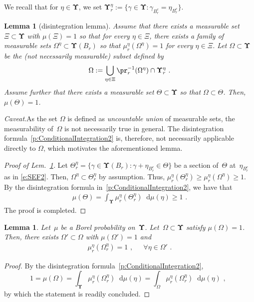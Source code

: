 \documentclass[11pt,letterpaper]{amsart}
\newcommand{\diff}{\mathop{}\!\mathrm{d}}
\newcommand{\comma}{\,\,\mathrm{,}\;\,}
\newcommand{\fstop}{\,\,\mathrm{.}}
\newcommand{\QP}{{\mu}}
\newcommand{\dUpsilon}{{\mathbf \Upsilon}}
\newcommand{\U}{\dUpsilon}
\renewcommand{\1}{\mathbf 1}
\numberwithin{equation}{section}
\theoremstyle{plain}
\newtheorem{lem}[thm]{Lemma}%
\theoremstyle{definition}
\theoremstyle{remark}
\renewcommand{\paragraph}[1]{\medskip\emph{#1}.\quad}
\begin{document}
\begin{appendix}
We recall that for $\eta \in \U$, we set $\U_r^\eta:=\{\gamma \in \U: \gamma_{B_r^c}=\eta_{B_r^c}\}$.
\begin{lem}[disintegration lemma] \label{l:sp}
Assume that there exists a measurable set $\Xi \subset \U$ with $\QP(\Xi)=1$ so that for every $\eta \in \Xi$, there exists a family of measurable sets $\Omega^\eta \subset \U(B_r)$ so that $\mu_{r}^\eta(\Omega^\eta)=1$ for every $\eta \in \Xi$. Let $\Omega \subset \U$ be the (not necessarily measurable) subset defined by
$$\Omega:=\bigcup_{\eta \in \Xi} \pr_{r}^{-1}(\Omega^\eta) \cap \U_{r}^{\eta} \fstop$$ 
Assume further that there exists a measurable set $\Theta \subset \U$ so that $\Omega \subset \Theta$. Then, $\QP(\Theta)=1$. 
\end{lem}
\paragraph{Caveat}As the set $\Omega$ is defined as {\it uncountable union} of measurable sets, the measurability of~$\Omega$ is not necessarily true in general. The disintegration formula~\eqref{p:ConditionalIntegration2} is, therefore, not necessarily applicable directly to $\Omega$,  which motivates the aforementioned lemma. 
\begin{proof}[Proof of Lem.\ \ref{l:sp}]
Let $\Theta_{r}^{\eta}=\{\gamma \in \U(B_r): \gamma+\eta_{B_r^c} \in \Theta\}$ be a section of~$\Theta$ at~$\eta_{B_r^c}$ as in \eqref{e:SEF2}. Then, $\Omega^{\eta} \subset \Theta_{r}^{\eta}$ by assumption. Thus, $\mu_r^\eta(\Theta_{r}^{\eta}) \ge \mu_r^\eta(\Omega^{\eta})\ge 1$. By the disintegration formula in~\eqref{p:ConditionalIntegration2}, we have that 
\begin{align*}
\mu(\Theta)= \int_{\U} \mu_r^\eta(\Theta_{r}^{\eta}) \diff \mu(\eta)  \ge 1\fstop
\end{align*}
The proof is completed. 
\end{proof}



  
  \begin{lem}\label{l:FL}
  Let~$\QP$ be a Borel probability on~$\U$. 
  Let~$\Omega \subset \U$ satisfy $\QP(\Omega)=1$. Then, there exists $\Omega'\subset \Omega$ with $\QP(\Omega')=1$ and 
  \begin{align}\label{e:FL}
  \QP_r^\eta(\Omega_r^\eta)=1\comma  \quad \forall\eta \in \Omega' \fstop
  \end{align}
  \end{lem}
  \begin{proof}
  By the disintegration formula~\eqref{p:ConditionalIntegration2}, 
  $$1=\QP(\Omega)=\int_{\U} \QP_r^\eta(\Omega_r^\eta) \diff \QP(\eta) =\int_{\Omega} \QP_r^\eta(\Omega_r^\eta) \diff \QP(\eta) \comma$$
  by which the statement is readily concluded.
  \end{proof}
  

\end{appendix}
\end{document}

